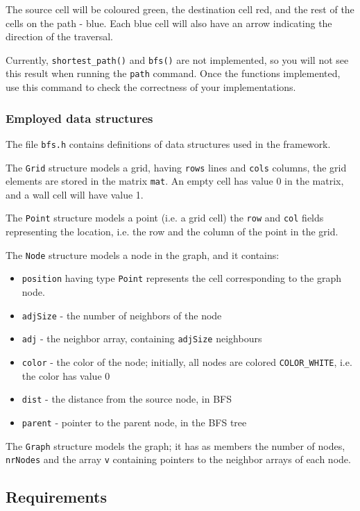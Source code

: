 \documentclass[../en-fa-lab.tex]{subfiles}
\begin{document}
The source cell will be coloured green, the destination cell red, and the rest of the cells on the path - blue. Each blue cell will also have an arrow indicating the direction of the traversal.

Currently, \texttt{shortest\_path()} and \texttt{bfs()} are not implemented, so you will not see this result when running the \texttt{path} command. Once the functions implemented, use this command to check the correctness of your implementations.

\subsubsection{Employed data structures }
The file \texttt{bfs.h} contains definitions of data structures used in the framework.

The \texttt{Grid} structure models a grid, having \texttt{rows} lines and \texttt{cols} columns, the grid elements are stored in the matrix \texttt{mat}. An empty cell has value 0 in the matrix, and a wall cell will have value 1. 

The \texttt{Point} structure models a point (i.e. a grid cell) the \texttt{row} and \texttt{col} fields representing the location, i.e. the row and the column of the point in the grid.

The \texttt{Node} structure models a node in the graph, and it contains:
\begin{itemize}
    \item \texttt{position} having type \texttt{Point} represents the cell corresponding to the graph node.
    \item \texttt{adjSize} - the number of neighbors of the node
    \item \texttt{adj} - the neighbor array, containing \texttt{adjSize} neighbours
    \item \texttt{color} - the color of the node; initially, all nodes are colored \texttt{COLOR\_WHITE}, i.e. the color has value 0
    \item \texttt{dist} -  the distance from the source node, in BFS
    \item \texttt{parent} - pointer to the parent node, in the BFS tree
\end{itemize}

The \texttt{Graph} structure models the graph; it has as members the number of nodes, \texttt{nrNodes} and the array \texttt{v} containing pointers to the neighbor arrays of each node.


\subsection{Requirements}
\end{document}
